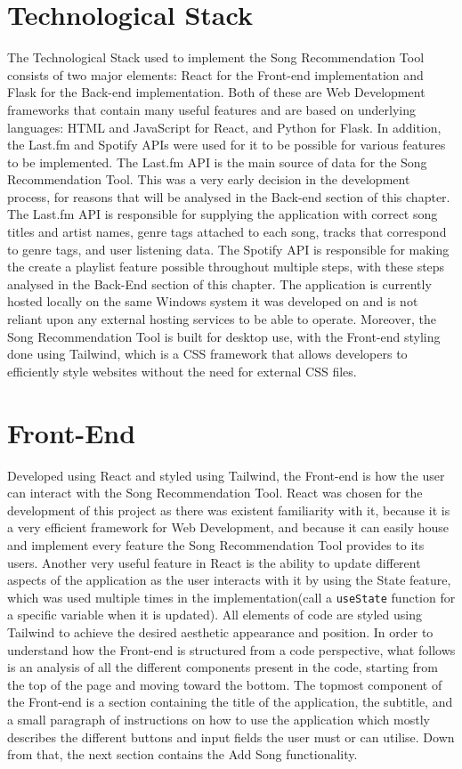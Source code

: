 \documentclass{l4proj}
\begin{document}
\section{Technological Stack}
The Technological Stack used to implement the Song Recommendation Tool consists of two major elements: React for the Front-end implementation and Flask for the Back-end implementation. Both of these are Web Development frameworks that contain many useful features and are based on underlying languages: HTML and JavaScript for React, and Python for Flask. In addition, the Last.fm and Spotify APIs were used for it to be possible for various features to be implemented. The Last.fm API is the main source of data for the Song Recommendation Tool. This was a very early decision in the development process, for reasons that will be analysed in the Back-end section of this chapter. The Last.fm API is responsible for supplying the application with correct song titles and artist names, genre tags attached to each song, tracks that correspond to genre tags, and user listening data. The Spotify API is responsible for making the create a playlist feature possible throughout multiple steps, with these steps analysed in the Back-End section of this chapter. The application is currently hosted locally on the same Windows system it was developed on and is not reliant upon any external hosting services to be able to operate. Moreover, the Song Recommendation Tool is built for desktop use, with the Front-end styling done using Tailwind, which is a CSS framework that allows developers to efficiently style websites without the need for external CSS files. 
\section{Front-End}
Developed using React and styled using Tailwind, the Front-end is how the user can interact with the Song Recommendation Tool. React was chosen for the development of this project as there was existent familiarity with it, because it is a very efficient framework for Web Development, and because it can easily house and implement every feature the Song Recommendation Tool provides to its users. Another very useful feature in React is the ability to update different aspects of the application as the user interacts with it by using the State feature, which was used multiple times in the implementation(call a \texttt{useState} function for a specific variable when it is updated). All elements of code are styled using Tailwind to achieve the desired aesthetic appearance and position. In order to understand how the Front-end is structured from a code perspective, what follows is an analysis of all the different components present in the code, starting from the top of the page and moving toward the bottom. The topmost component of the Front-end is a section containing the title of the application, the subtitle, and a small paragraph of instructions on how to use the application which mostly describes the different buttons and input fields the user must or can utilise. Down from that, the next section contains the Add Song functionality. 
\end{document}
